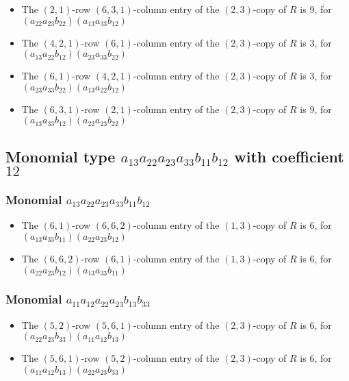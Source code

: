 \documentclass{article}
\begin{document}
\begin{itemize}
\item The $(2, 1)$-row $(6, 3, 1)$-column entry of the $ \left(2, 3\right) $-copy of $R$ is $ 9 $, for $( a_{22} a_{23} b_{22} )( a_{13} a_{33} b_{12} )$ 
\item The $(4, 2, 1)$-row $(6, 1)$-column entry of the $ \left(2, 3\right) $-copy of $R$ is $ 3 $, for $( a_{13} a_{22} b_{12} )( a_{23} a_{33} b_{22} )$ 
\item The $(6, 1)$-row $(4, 2, 1)$-column entry of the $ \left(2, 3\right) $-copy of $R$ is $ 3 $, for $( a_{23} a_{33} b_{22} )( a_{13} a_{22} b_{12} )$ 
\item The $(6, 3, 1)$-row $(2, 1)$-column entry of the $ \left(2, 3\right) $-copy of $R$ is $ 9 $, for $( a_{13} a_{33} b_{12} )( a_{22} a_{23} b_{22} )$ 
\end{itemize}
\subsection{Monomial type $ a_{13} a_{22} a_{23} a_{33} b_{11} b_{12} $ with coefficient $ 12 $}

\subsubsection{Monomial $ a_{13} a_{22} a_{23} a_{33} b_{11} b_{12} $}

\begin{itemize}
\item The $(6, 1)$-row $(6, 6, 2)$-column entry of the $ \left(1, 3\right) $-copy of $R$ is $ 6 $, for $( a_{13} a_{33} b_{11} )( a_{22} a_{23} b_{12} )$ 
\item The $(6, 6, 2)$-row $(6, 1)$-column entry of the $ \left(1, 3\right) $-copy of $R$ is $ 6 $, for $( a_{22} a_{23} b_{12} )( a_{13} a_{33} b_{11} )$ 
\end{itemize}
\subsubsection{Monomial $ a_{11} a_{12} a_{22} a_{23} b_{13} b_{33} $}

\begin{itemize}
\item The $(5, 2)$-row $(5, 6, 1)$-column entry of the $ \left(2, 3\right) $-copy of $R$ is $ 6 $, for $( a_{22} a_{23} b_{33} )( a_{11} a_{12} b_{13} )$ 
\item The $(5, 6, 1)$-row $(5, 2)$-column entry of the $ \left(2, 3\right) $-copy of $R$ is $ 6 $, for $( a_{11} a_{12} b_{13} )( a_{22} a_{23} b_{33} )$ 
\end{itemize}
\end{document}
